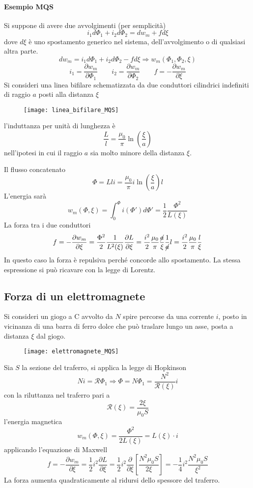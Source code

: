 \paragraph{Esempio MQS} Si suppone di avere due avvolgimenti (per semplicità)
$$
i_1d\Phi_1 + i_2d\Phi_2 = dw_m + fd\xi
$$
dove $d\xi$ è uno spostamento generico nel sistema, dell'avvolgimento o di qualsiasi altra parte.
$$
dw_m = i_1d\Phi_1 + i_2d\Phi_2 - fd\xi\Rightarrow w_m\left(\Phi_1,\Phi_2,\xi\right)
$$
$$
i_1 = \frac{\partial w_m}{\partial \Phi_1}\qquad i_2 = \frac{\partial w_m}{\partial \Phi_2}\qquad f = -\frac{\partial w_m}{\partial \xi}
$$
Si consideri una linea bifilare schematizzata da due conduttori cilindrici indefiniti di raggio $a$
posti alla distanza $\xi$
\begin{figure}[H]
\centering
\texttt{[image: linea\_bifilare\_MQS]}
\end{figure}
l'induttanza per unità di lunghezza è
$$
\frac{L}{l} = \frac{\mu_0}{\pi} \ln\left(\frac{\xi}{a}\right)
$$
nell'ipotesi in cui il raggio $a$ sia molto minore della distanza $\xi$.

Il flusso concatenato 
$$
\Phi = Lli = \frac{\mu_0}{\pi}i \ln\left(\frac{\xi}{a}\right)l
$$
L'energia sarà
$$
w_m(\Phi,\xi) = \int_0^\Phi i(\Phi')d\Phi' = \frac{1}{2}\frac{\Phi^2}{L(\xi)}
$$
La forza tra i due conduttori
$$
f = -\frac{\partial w_m}{\partial \xi} = \frac{\Phi^2}{2}\frac{1}{L^2(\xi)}\frac{\partial L}{\partial \xi} =
\frac{i^2}{2}\frac{\mu_0}{\pi}\frac{\cancel{a}}{\xi}\frac{1}{\cancel{a}} l =
\frac{i^2}{2}\frac{\mu_0}{\pi}\frac{l}{\xi}
$$
In questo caso la forza è repulsiva perché concorde allo spostamento.
La stessa espressione si può ricavare con la legge di Lorentz.
\newpage
\subsection{Forza di un elettromagnete}
Si consideri un giogo a C avvolto da $N$ spire percorse da una corrente $i$, posto in vicinanza
di una barra di ferro dolce che può traslare lungo un asse, posta a distanza $\xi$ dal giogo.
\begin{figure}[H]
\centering
\texttt{[image: elettromagnete\_MQS]}
\end{figure}
Sia $S$ la sezione del traferro, si applica la legge di Hopkinson
$$
Ni = \mathcal{R}\Phi_1 \Rightarrow \Phi = N\Phi_1 = \frac{N^2}{\mathcal{R}(\xi)}i
$$
con la riluttanza nel traferro pari a
$$
\mathcal{R}(\xi) = \frac{2\xi}{\mu_0 S}
$$
l'energia magnetica
$$
w_m(\Phi,\xi) = \frac{\Phi^2}{2L(\xi)} = L(\xi)\cdot i
$$
applicando l'equazione di Maxwell
$$
f = -\frac{\partial w_m}{\partial \xi} = \frac{1}{2}i^2 \frac{\partial L}{\partial \xi} =
\frac{1}{2}i^2\frac{\partial}{\partial \xi} \left[\frac{N^2\mu_0 S}{2\xi}\right] = 
-\frac{1}{4}i^2\frac{N^2\mu_0 S}{\xi^2}
$$
La forza aumenta quadraticamente al ridursi dello spessore del traferro.

